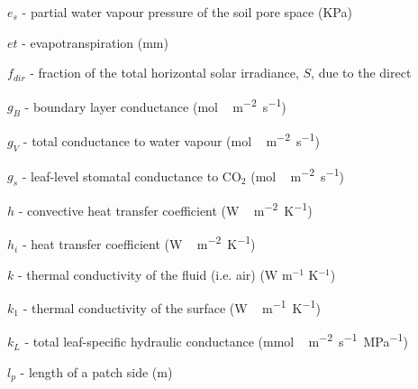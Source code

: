 {\begin{description}
\item $e_{s}$  -  partial water vapour pressure of the soil pore space (\unit{KPa}) 
\item $et$  -  evapotranspiration (\unit{mm}) 
\item $f_{dir}$  -  fraction of the total horizontal solar irradiance, $S$, due to the direct 
\item $g_{B}$  -  boundary layer conductance (\unit{mol\,m^{-2}s^{-1}}) 
\item $g_{V}$   -  total conductance to water vapour (\unit{mol\,m^{-2}s^{-1}}) 
\item $g_{s}$  -  leaf-level stomatal conductance to CO$_{2}$ (\unit{mol\,m^{-2}s^{-1}}) 
\item $h$  -  convective heat transfer coefficient (\unit{W\,m^{-2}K^{-1}}) 
\item $h_{i}$  -   heat transfer coefficient (\unit{W\,m^{-2}K^{-1}}) 
\item $k$  -  thermal conductivity of the fluid (i.e. air) (W m$^{-1}$ K$^{-1}$) 
\item $k_{1}$  -  thermal conductivity of the surface (\unit{W\,m^{-1}K^{-1}}) 
\item $k_{L}$  -  total leaf-specific hydraulic conductance (m\unit{mol\,m^{-2}s^{-1}MPa^{-1}}) 
\item $l_{p}$  -  length of a patch side (\unit{m}) 

\end{description}}
